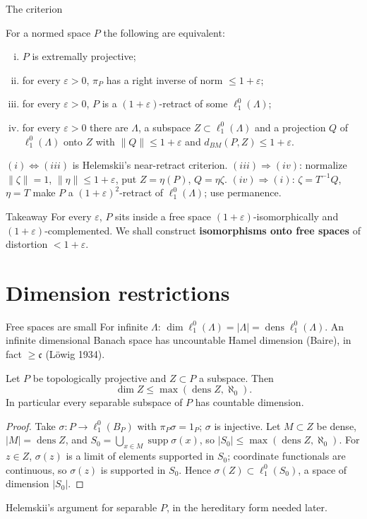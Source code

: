\documentclass[10pt,aspectratio=169]{beamer}
\newcommand{\lo}[1]{\ell_1^0(#1)}
\newcommand{\supp}{\operatorname{supp}}
\newcommand{\dens}{\operatorname{dens}}
\newcommand{\BM}{d_{BM}}
\begin{document}
\begin{frame}{The criterion}
  \begin{theorem}
    For a normed space $P$ the following are equivalent:
    \begin{enumerate}[(i)]
      \item $P$ is extremally projective;
      \item for every $\varepsilon>0$, $\pi_P$ has a right inverse of norm $\le1+\varepsilon$;
      \item for every $\varepsilon>0$, $P$ is a $(1+\varepsilon)$-retract of some $\lo\Lambda$;
      \item for every $\varepsilon>0$ there are $\Lambda$, a subspace
        $Z\subset\lo\Lambda$ and a projection $Q$ of $\lo\Lambda$ onto $Z$ with
        $\|Q\|\le1+\varepsilon$ and $\BM(P,Z)\le1+\varepsilon$.
    \end{enumerate}
  \end{theorem}
  $(i)\Leftrightarrow(iii)$ is Helemskii's near-retract criterion.
  $(iii)\Rightarrow(iv)$: normalize $\|\zeta\|=1$, $\|\eta\|\le1+\varepsilon$,
  put $Z=\eta(P)$, $Q=\eta\zeta$.
  $(iv)\Rightarrow(i)$: $\zeta=T^{-1}Q$, $\eta=T$ make $P$ a
  ${(1+\varepsilon)}^2$-retract of $\lo\Lambda$; use permanence.
  \begin{alertblock}{Takeaway}
    For every $\varepsilon$, $P$ sits inside a free space
    $(1+\varepsilon)$-isomorphically and $(1+\varepsilon)$-complemented.
    We shall construct \textbf{isomorphisms onto free spaces} of
    distortion $<1+\varepsilon$.
  \end{alertblock}
\end{frame}

\section{Dimension restrictions}

\begin{frame}{Free spaces are small}
  For infinite $\Lambda$: $\dim\lo\Lambda=|\Lambda|=\dens\lo\Lambda$. An infinite
  dimensional Banach space has uncountable Hamel dimension (Baire), in fact
  $\ge\mathfrak c$ (L\"owig 1934).
  \begin{theorem}
    Let $P$ be topologically projective and $Z\subset P$ a subspace. Then
    \[
      \dim Z\le\max(\dens Z,\aleph_0).
    \]
    In particular every separable subspace of $P$ has countable dimension.
  \end{theorem}
  \begin{proof}
    Take $\sigma\colon P\to\lo{B_P}$ with $\pi_P\sigma=1_P$; $\sigma$ is injective.
    Let $M\subset Z$ be dense, $|M|=\dens Z$, and
    $S_0=\bigcup_{x\in M}\supp\sigma(x)$, so $|S_0|\le\max(\dens Z,\aleph_0)$.
    For $z\in Z$, $\sigma(z)$ is a limit of elements supported in $S_0$;
    coordinate functionals are continuous, so $\sigma(z)$ is supported in $S_0$.
    Hence $\sigma(Z)\subset\lo{S_0}$, a space of dimension $|S_0|$.
  \end{proof}
  Helemskii's argument for separable $P$, in the hereditary form needed later.
\end{frame}
\end{document}
